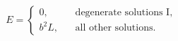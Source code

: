 \begin{equation*}
  E=\left\lbrace
\begin{aligned}
  0, &~~~~\text{degenerate solutions I},
\\
  b^2L,&~~~~\text{all other solutions}.
\end{aligned} \right.
\end{equation*}

